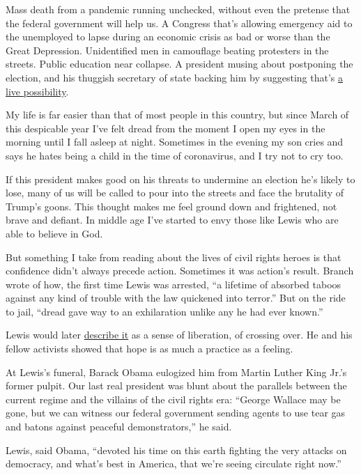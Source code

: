 Mass death from a pandemic running unchecked, without even the pretense
that the federal government will help us. A Congress that's allowing
emergency aid to the unemployed to lapse during an economic crisis as
bad or worse than the Great Depression. Unidentified men in camouflage
beating protesters in the streets. Public education near collapse. A
president musing about postponing the election, and his thuggish
secretary of state backing him by suggesting that's
\href{https://twitter.com/atrupar/status/1288847087950495749?s=20}{a
live possibility}.

My life is far easier than that of most people in this country, but
since March of this despicable year I've felt dread from the moment I
open my eyes in the morning until I fall asleep at night. Sometimes in
the evening my son cries and says he hates being a child in the time of
coronavirus, and I try not to cry too.

If this president makes good on his threats to undermine an election
he's likely to lose, many of us will be called to pour into the streets
and face the brutality of Trump's goons. This thought makes me feel
ground down and frightened, not brave and defiant. In middle age I've
started to envy those like Lewis who are able to believe in God.

But something I take from reading about the lives of civil rights heroes
is that confidence didn't always precede action. Sometimes it was
action's result. Branch wrote of how, the first time Lewis was arrested,
``a lifetime of absorbed taboos against any kind of trouble with the law
quickened into terror.'' But on the ride to jail, ``dread gave way to an
exhilaration unlike any he had ever known.''

Lewis would later
\href{https://twitter.com/repjohnlewis/status/489776381363236864?s=20}{describe
it} as a sense of liberation, of crossing over. He and his fellow
activists showed that hope is as much a practice as a feeling.

At Lewis's funeral, Barack Obama eulogized him from Martin Luther King
Jr.'s former pulpit. Our last real president was blunt about the
parallels between the current regime and the villains of the civil
rights era: ``George Wallace may be gone, but we can witness our federal
government sending agents to use tear gas and batons against peaceful
demonstrators,'' he said.

Lewis, said Obama, ``devoted his time on this earth fighting the very
attacks on democracy, and what's best in America, that we're seeing
circulate right now.''

